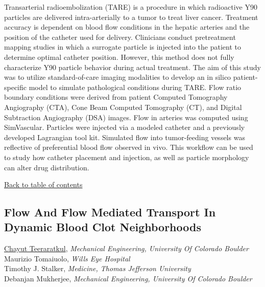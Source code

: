 \noindent Transarterial radioembolization (TARE) is a procedure in which radioactive Y90 particles are delivered intra-arterially to a tumor to treat liver cancer. Treatment accuracy is dependent on blood flow conditions in the hepatic arteries and the position of the catheter used for delivery. Clinicians conduct pretreatment mapping studies in which a surrogate particle is injected into the patient to determine optimal catheter position. However, this method does not fully characterize Y90 particle behavior during actual treatment. The aim of this study was to utilize standard-of-care imaging modalities to develop an in silico patient-specific model to simulate pathological conditions during TARE. Flow ratio boundary conditions were derived from patient Computed Tomography Angiography (CTA), Cone Beam Computed Tomography (CT), and Digital Subtraction Angiography (DSA) images. Flow in arteries was computed using SimVascular. Particles were injected via a modeled catheter and a previously developed Lagrangian tool kit. Simulated flow into tumor-feeding vessels was reflective of preferential blood flow observed in vivo. This workflow can be used to study how catheter placement and injection, as well as particle morphology can alter drug distribution.  \\ 
\begin{flushright}\vspace{-0.2 in}\hyperlink{toc}{Back to table of contents}\end{flushright}\vspace{-0.2 in}
\hypertarget{ChayutTeeraratkul}{\subsection*{\color{CUGOLD} Flow And Flow Mediated Transport In Dynamic Blood Clot Neighborhoods}} \vsp 
\underline{Chayut Teeraratkul}, \textit{Mechanical Engineering, University Of Colorado Boulder}\\ 
{Maurizio Tomaiuolo}, \textit{Wills Eye Hospital}\\ 
{Timothy J. Stalker}, \textit{Medicine, Thomas Jefferson University}\\ 
{Debanjan Mukherjee}, \textit{Mechanical Engineering, University Of Colorado Boulder}\\ 
\vspace{-0.1 in} \\ 
